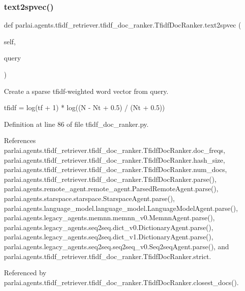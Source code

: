 \subsubsection{\texorpdfstring{text2spvec()}{text2spvec()}}
{\footnotesize\ttfamily def parlai.\+agents.\+tfidf\+\_\+retriever.\+tfidf\+\_\+doc\+\_\+ranker.\+Tfidf\+Doc\+Ranker.\+text2spvec (\begin{DoxyParamCaption}\item[{}]{self,  }\item[{}]{query }\end{DoxyParamCaption})}

\begin{DoxyVerb}Create a sparse tfidf-weighted word vector from query.

tfidf = log(tf + 1) * log((N - Nt + 0.5) / (Nt + 0.5))
\end{DoxyVerb}
 

Definition at line 86 of file tfidf\+\_\+doc\+\_\+ranker.\+py.



References parlai.\+agents.\+tfidf\+\_\+retriever.\+tfidf\+\_\+doc\+\_\+ranker.\+Tfidf\+Doc\+Ranker.\+doc\+\_\+freqs, parlai.\+agents.\+tfidf\+\_\+retriever.\+tfidf\+\_\+doc\+\_\+ranker.\+Tfidf\+Doc\+Ranker.\+hash\+\_\+size, parlai.\+agents.\+tfidf\+\_\+retriever.\+tfidf\+\_\+doc\+\_\+ranker.\+Tfidf\+Doc\+Ranker.\+num\+\_\+docs, parlai.\+agents.\+tfidf\+\_\+retriever.\+tfidf\+\_\+doc\+\_\+ranker.\+Tfidf\+Doc\+Ranker.\+parse(), parlai.\+agents.\+remote\+\_\+agent.\+remote\+\_\+agent.\+Parsed\+Remote\+Agent.\+parse(), parlai.\+agents.\+starspace.\+starspace.\+Starspace\+Agent.\+parse(), parlai.\+agents.\+language\+\_\+model.\+language\+\_\+model.\+Language\+Model\+Agent.\+parse(), parlai.\+agents.\+legacy\+\_\+agents.\+memnn.\+memnn\+\_\+v0.\+Memnn\+Agent.\+parse(), parlai.\+agents.\+legacy\+\_\+agents.\+seq2seq.\+dict\+\_\+v0.\+Dictionary\+Agent.\+parse(), parlai.\+agents.\+legacy\+\_\+agents.\+seq2seq.\+dict\+\_\+v1.\+Dictionary\+Agent.\+parse(), parlai.\+agents.\+legacy\+\_\+agents.\+seq2seq.\+seq2seq\+\_\+v0.\+Seq2seq\+Agent.\+parse(), and parlai.\+agents.\+tfidf\+\_\+retriever.\+tfidf\+\_\+doc\+\_\+ranker.\+Tfidf\+Doc\+Ranker.\+strict.



Referenced by parlai.\+agents.\+tfidf\+\_\+retriever.\+tfidf\+\_\+doc\+\_\+ranker.\+Tfidf\+Doc\+Ranker.\+closest\+\_\+docs().

